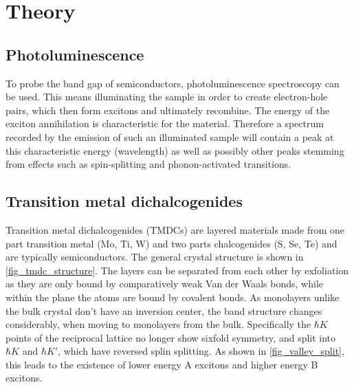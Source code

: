 \section{Theory}
\label{sec:theory}

\subsection{Photoluminescence}

To probe the band gap of semiconductors, photoluminescence spectroscopy can be used.
This means illuminating the sample in order to create electron-hole pairs, which then form excitons and ultimately recombine.
The energy of the exciton annihilation is characteristic for the material.
Therefore a spectrum recorded by the emission of such an illuminated sample will contain a peak at this characteristic energy (wavelength) as well as possibly other peaks stemming from effects such as spin-splitting and phonon-activated transitions.

\subsection{Transition metal dichalcogenides}

Transition metal dichalcogenides (TMDCs) are layered materials made from one part transition metal (Mo, Ti, W) and two parts chalcogenides (S, Se, Te) and are typically semiconductors.
The general crystal structure is shown in \cref{fig_tmdc_structure}.
The layers can be separated from each other by exfoliation as they are only bound by comparatively weak Van der Waals bonds, while within the plane the atoms are bound by covalent bonds.
As monolayers unlike the bulk crystal don't have an inversion center, the band structure changes considerably, when moving to monolayers from the bulk.
Specifically the $\hbar{K}$ points of the reciprocal lattice no longer show sixfold symmetry, and split into $\hbar{K}$ and $\hbar{K}'$, which have reversed splin splitting.
As shown in \cref{fig_valley_split}, this leads to the existence of lower energy A excitons and higher energy B excitons.

